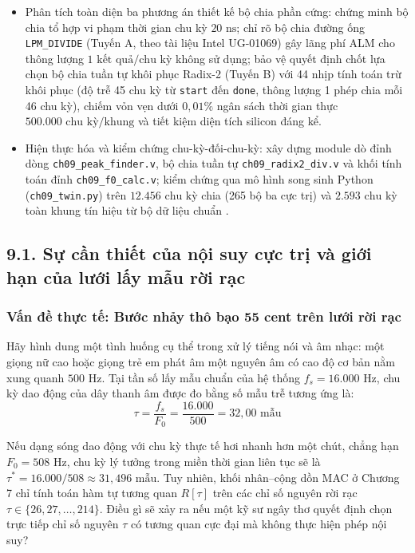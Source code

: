 \begin{learningobj}
\begin{itemize}[leftmargin=1.5em, itemsep=2pt]
    \item Phân tích toàn diện ba phương án thiết kế bộ chia phần cứng: chứng minh bộ chia tổ hợp vi phạm thời gian chu kỳ $20\text{ ns}$; chỉ rõ bộ chia đường ống \texttt{LPM\_DIVIDE} (Tuyến A, theo tài liệu Intel UG-01069) gây lãng phí ALM cho thông lượng $1\text{ kết quả/chu kỳ}$ không sử dụng; bảo vệ quyết định chốt lựa chọn bộ chia tuần tự khôi phục Radix-2 (Tuyến B) với 44 nhịp tính toán trừ khôi phục (độ trễ 45 chu kỳ từ \texttt{start} đến \texttt{done}, thông lượng 1 phép chia mỗi 46 chu kỳ), chiếm vỏn vẹn dưới $0{,}01\%$ ngân sách thời gian thực $500.000\text{ chu kỳ/khung}$ và tiết kiệm diện tích silicon đáng kể.
    \item Hiện thực hóa và kiểm chứng chu-kỳ-đối-chu-kỳ: xây dựng module dò đỉnh dòng \texttt{ch09\_peak\_finder.v}, bộ chia tuần tự \texttt{ch09\_radix2\_div.v} và khối tính toán đỉnh \texttt{ch09\_f0\_calc.v}; kiểm chứng qua mô hình song sinh Python (\texttt{ch09\_twin.py}) trên $12.456\text{ chu kỳ}$ chia (265 bộ ba cực trị) và $2.593\text{ chu kỳ}$ toàn khung tín hiệu từ bộ dữ liệu chuẩn .
\end{itemize}
\end{learningobj}

\subsection*{9.1. Sự cần thiết của nội suy cực trị và giới hạn của lưới lấy mẫu rời rạc}

\subsubsection*{Vấn đề thực tế: Bước nhảy thô bạo 55 cent trên lưới rời rạc}
Hãy hình dung một tình huống cụ thể trong xử lý tiếng nói và âm nhạc: một giọng nữ cao hoặc giọng trẻ em phát âm một nguyên âm có cao độ cơ bản nằm xung quanh $500\text{ Hz}$. Tại tần số lấy mẫu chuẩn của hệ thống $f_s = 16.000\text{ Hz}$, chu kỳ dao động của dây thanh âm được đo bằng số mẫu trễ tương ứng là:
\begin{equation}
\tau = \frac{f_s}{F_0} = \frac{16.000}{500} = 32{,}00\text{ mẫu}
\end{equation}

Nếu dạng sóng dao động với chu kỳ thực tế hơi nhanh hơn một chút, chẳng hạn $F_0 = 508\text{ Hz}$, chu kỳ lý tưởng trong miền thời gian liên tục sẽ là $\tau^* = 16.000 / 508 \approx 31{,}496\text{ mẫu}$. Tuy nhiên, khối nhân--cộng dồn MAC ở Chương 7 chỉ tính toán hàm tự tương quan $R[\tau]$ trên các chỉ số nguyên rời rạc $\tau \in \{26, 27, \dots, 214\}$. Điều gì sẽ xảy ra nếu một kỹ sư ngây thơ quyết định chọn trực tiếp chỉ số nguyên $\tau$ có tương quan cực đại mà không thực hiện phép nội suy?

